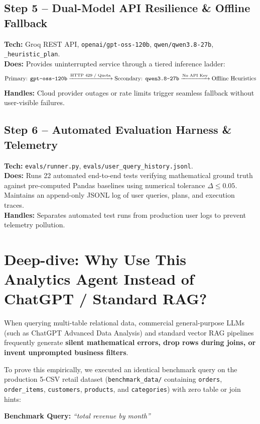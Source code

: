 \documentclass[11pt,a4paper]{article}
\begin{document}
\subsection{Step 5 -- Dual-Model API Resilience \& Offline Fallback}
\textbf{Tech:} Groq REST API, \texttt{openai/gpt-oss-120b}, \texttt{qwen/qwen3.8-27b}, \texttt{\_heuristic\_plan}.\\
\textbf{Does:} Provides uninterrupted service through a tiered inference ladder:
$$\text{Primary: \texttt{gpt-oss-120b}} \xrightarrow{\text{HTTP 429 / Quota}} \text{Secondary: \texttt{qwen3.8-27b}} \xrightarrow{\text{No API Key}} \text{Offline Heuristics}$$
\textbf{Handles:} Cloud provider outages or rate limits trigger seamless fallback without user-visible failures.

\subsection{Step 6 -- Automated Evaluation Harness \& Telemetry}
\textbf{Tech:} \texttt{evals/runner.py}, \texttt{evals/user\_query\_history.jsonl}.\\
\textbf{Does:} Runs 22 automated end-to-end tests verifying mathematical ground truth against pre-computed Pandas baselines using numerical tolerance $\Delta \le 0.05$. Maintains an append-only JSONL log of user queries, plans, and execution traces.\\
\textbf{Handles:} Separates automated test runs from production user logs to prevent telemetry pollution.

\newpage
\section{Deep-dive: Why Use This Analytics Agent Instead of ChatGPT / Standard RAG?}

When querying multi-table relational data, commercial general-purpose LLMs (such as ChatGPT Advanced Data Analysis) and standard vector RAG pipelines frequently generate \textbf{silent mathematical errors, drop rows during joins, or invent unprompted business filters}.

To prove this empirically, we executed an identical benchmark query on the production 5-CSV retail dataset (\texttt{benchmark\_data/} containing \texttt{orders}, \texttt{order\_items}, \texttt{customers}, \texttt{products}, and \texttt{categories}) with zero table or join hints:
\begin{center}
\textbf{Benchmark Query:} \emph{``total revenue by month''}
\end{center}
\end{document}

